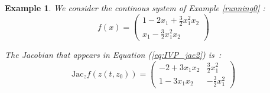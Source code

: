 \documentclass{sig-alternate-05-2015} %
\newcommand\ForAuthors[1]%
 {\par\smallskip                     %
  \begin{center}%
   \fbox%
   {\parbox{0.9\linewidth}%
    {\raggedright\sc--- #1}%
   }%
  \end{center}%
  \par\smallskip                     %
 }
\newtheorem{example}{Example}
\begin{document}
\begin{example}
\label{running1}
We consider the continous system of Example \ref{running0} : 
$$ f(x) = \left(\begin{array}{l}
1-2 x_1+\frac{3}{2} x_1^2 x_2 \\
x_1-\frac{3}{2} x_1^2x_2
\end{array}\right)$$

The Jacobian that appears in Equation (\ref{eq:IVP_jac2}) is~: 
$$
\mbox{Jac}_z f(z(t,z_0)) = \left(\begin{array}{cc} 
-2+3x_1x_2  & \frac{3}{2} x^2_1 \\
1-3x_1x_2 & -\frac{3}{2} x^2_1
\end{array}\right)
$$
\end{example}
\end{document}
